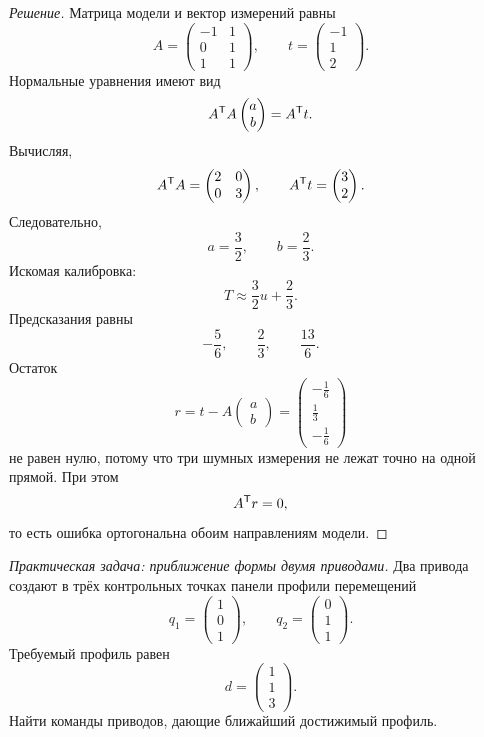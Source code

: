 \begin{proof}[Решение]
Матрица модели и вектор измерений равны
\[
A=
\begin{pmatrix}
-1&1\\
0&1\\
1&1
\end{pmatrix},
\qquad
t=
\begin{pmatrix}
-1\\1\\2
\end{pmatrix}.
\]
Нормальные уравнения имеют вид
\[
A^{\mathsf{T}}A
\begin{pmatrix}a\\b\end{pmatrix}
=
A^{\mathsf{T}}t.
\]
Вычисляя,
\[
A^{\mathsf{T}}A
=
\begin{pmatrix}
2&0\\
0&3
\end{pmatrix},
\qquad
A^{\mathsf{T}}t
=
\begin{pmatrix}
3\\2
\end{pmatrix}.
\]
Следовательно,
\[
a=\frac32,
\qquad
b=\frac23.
\]
Искомая калибровка:
\[
T\approx\frac32u+\frac23.
\]
Предсказания равны
\[
-\frac56,\qquad \frac23,\qquad \frac{13}{6}.
\]
Остаток
\[
r=t-A
\begin{pmatrix}a\\b\end{pmatrix}
=
\begin{pmatrix}
-\frac16\\[2mm]
\frac13\\[2mm]
-\frac16
\end{pmatrix}
\]
не равен нулю, потому что три шумных измерения не лежат точно на одной прямой. При этом
\[
A^{\mathsf{T}}r=0,
\]
то есть ошибка ортогональна обоим направлениям модели.
\end{proof}

\begin{problem}
\textit{Практическая задача: приближение формы двумя приводами.}
Два привода создают в трёх контрольных точках панели профили перемещений
\[
q_1=
\begin{pmatrix}
1\\0\\1
\end{pmatrix},
\qquad
q_2=
\begin{pmatrix}
0\\1\\1
\end{pmatrix}.
\]
Требуемый профиль равен
\[
d=
\begin{pmatrix}
1\\1\\3
\end{pmatrix}.
\]
Найти команды приводов, дающие ближайший достижимый профиль.
\end{problem}


